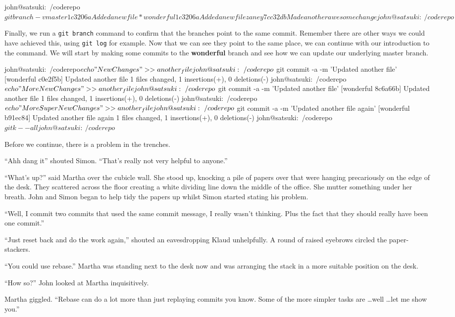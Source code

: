 \begin{code} 
john@satsuki:~/coderepo$ git branch -v
  master    1c3206a Added a new file
* wonderful 1c3206a Added a new file
  zaney     7cc32db Made another awesome change
john@satsuki:~/coderepo$ 
\end{code}

Finally, we run a \texttt{git branch} command to confirm that the branches point to the same commit.  Remember there are other ways we could have achieved this, using \texttt{git log} for example.  Now that we can see they point to the same place, we can continue with our introduction to the  command.  We will start by making some commits to the \textbf{wonderful} branch and see how we can update our underlying master branch.

\begin{code}
john@satsuki:~/coderepo$ echo "New Changes" >> another_file 
john@satsuki:~/coderepo$ git commit -a -m 'Updated another file'
[wonderful c0e2f5b] Updated another file
 1 files changed, 1 insertions(+), 0 deletions(-)
john@satsuki:~/coderepo$ echo "More New Changes" >> another_file 
john@satsuki:~/coderepo$ git commit -a -m 'Updated another file'
[wonderful 8c6a66b] Updated another file
 1 files changed, 1 insertions(+), 0 deletions(-)
john@satsuki:~/coderepo$ echo "More Super New Changes" >> another_file 
john@satsuki:~/coderepo$ git commit -a -m 'Updated another file again'
[wonderful b91ec84] Updated another file again
 1 files changed, 1 insertions(+), 0 deletions(-)
john@satsuki:~/coderepo$ gitk --all
john@satsuki:~/coderepo$ 
\end{code}

Before we continue, there is a problem in the trenches.

\begin{trenches}
``Ahh dang it'' shouted Simon.  ``That's really not very helpful to anyone.''

``What's up?'' said Martha over the cubicle wall.  She stood up, knocking a pile of papers over that were hanging precariously on the edge of the desk.  They scattered across the floor creating a white dividing line down the middle of the office.  She mutter something under her breath.  John and Simon began to help tidy the papers up whilst Simon started stating his problem.

``Well, I commit two commits that used the same commit message, I really wasn't thinking.  Plus the fact that they should really have been one commit.''

``Just reset back and do the work again,'' shouted an eavesdropping Klaud unhelpfully.  A round of raised eyebrows circled the paper-stackers.

``You could use rebase.''  Martha was standing next to the desk now and was arranging the stack in a more suitable position on the desk.  

``How so?''  John looked at Martha inquisitively.  

Martha giggled. ``Rebase can do a lot more than just replaying commits you know.  Some of the more simpler tasks are \ldots well \ldots let me show you.''
\end{trenches}

